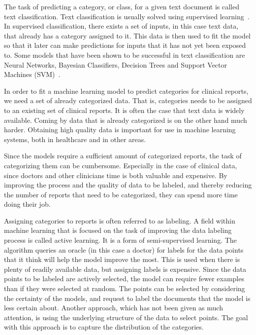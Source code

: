 The task of predicting a category, or class, for a given text document is called text classification.
Text classification is usually solved using supervised learning~\cite{aggarwal2012surveyclass}. 
In supervised classification, there exists a set of inputs, in this case text data, that already has a category assigned to it.
This data is then used to fit the model so that it later can make predictions for inputs that it has not yet been exposed to.
Some models that have been shown to be successful in text classification are Neural Networks, Bayesian Classifiers, Decision Trees and Support Vector Machines (SVM)~\cite{aggarwal2012surveyclass,joachims1998text, aggarwal2012surveyclass, tong2001support}.

In order to fit a machine learning model to predict categories for clinical reports, we need a set of already categorized data.
That is, categories needs to be assigned to an existing set of clinical reports.
It is often the case that text data is widely available.
Coming by data that is already categorized is on the other hand much harder.
Obtaining high quality data is important for use in machine learning systems, both in healthcare and in other areas.

Since the models require a sufficient amount of categorized reports, the task of categorizing them can be cumbersome.
Especially in the case of clinical data, since doctors and other clinicians time is both valuable and expensive.
By improving the process and the quality of data to be labeled, and thereby reducing the number of reports that need to be categorized, they can spend more time doing their job.

Assigning categories to reports is often referred to as labeling.
A field within machine learning that is focused on the task of improving the data labeling process is called active learning.
It is a form of semi-supervised learning.
The algorithm queries an oracle (in this case a doctor) for labels for the data points that it think will help the model improve the most.
This is used when there is plenty of readily available data, but assigning labels is expensive.
Since the data points to be labeled are actively selected, the model can require fewer examples than if they were selected at random.
The points can be selected by considering the certainty of the models, and request to label the documents that the model is less certain about.
Another approach, which has not been given as much attention, is using the underlying structure of the data to select points.
The goal with this approach is to capture the distribution of the categories.

